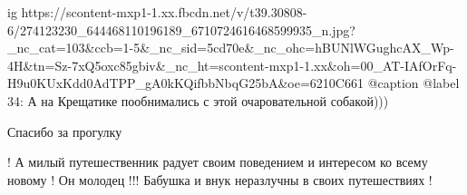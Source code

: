  
 
 
 
 

\ifcmt
  ig https://scontent-mxp1-1.xx.fbcdn.net/v/t39.30808-6/274123230_644468110196189_6710724616468599935_n.jpg?_nc_cat=103&ccb=1-5&_nc_sid=5cd70e&_nc_ohc=hBUNlWGughcAX_Wp-4H&tn=Sz-7xQ5oxc85gbiv&_nc_ht=scontent-mxp1-1.xx&oh=00_AT-IAfOrFq-H9u0KUxKdd0AdTPP_gA0kKQifbbNbqG25bA&oe=6210C661
  @caption @label 34: А на Крещатике пообнимались с этой очаровательной собакой)))
\fi

Спасибо за прогулку


! А милый путешественник радует своим поведением и интересом ко всему новому !
Он молодец !!! Бабушка и внук неразлучны в своих путешествиях !
